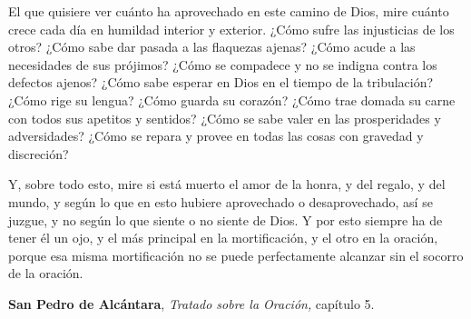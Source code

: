 

\begin{ccebody}
	
	
	
	
	
	
	
	
	
	
	
	
	
	
	
	
	
	
	
	
\end{ccebody}

\begin{patercite}
	El que quisiere ver cuánto ha aprovechado en este camino de Dios, mire cuánto crece cada día en humildad interior y exterior. ¿Cómo sufre las injusticias de los otros? ¿Cómo sabe dar pasada a las flaquezas ajenas? ¿Cómo acude a las necesidades de sus prójimos? ¿Cómo se compadece y no se indigna contra los defectos ajenos? ¿Cómo sabe esperar en Dios en el tiempo de la tribulación? ¿Cómo rige su lengua? ¿Cómo guarda su corazón? ¿Cómo trae domada su carne con todos sus apetitos y sentidos? ¿Cómo se sabe valer en las prosperidades y adversidades? ¿Cómo se repara y provee en todas las cosas con gravedad y discreción?
	
	Y, sobre todo esto, mire si está muerto el amor de la honra, y del regalo, y del mundo, y según lo que en esto hubiere aprovechado o desaprovechado, así se juzgue, y no según lo que siente o no siente de Dios. Y por esto siempre ha de tener él un ojo, y el más principal en la mortificación, y el otro en la oración, porque esa misma mortificación no se puede perfectamente alcanzar sin el socorro de la oración.
	
	\textbf{San Pedro de Alcántara}, \emph{Tratado sobre la Oración,} capítulo 5.			
\end{patercite}

\newsection



